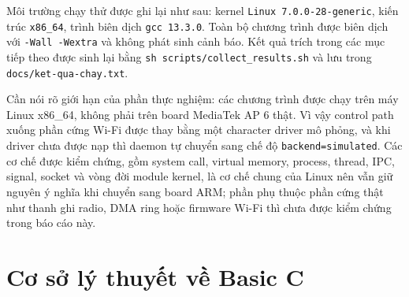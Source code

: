 \documentclass[11pt]{article}
\newcommand{\code}[1]{\texttt{#1}}
\begin{document}
\begin{center}
\end{center}

Môi trường chạy thử được ghi lại như sau: kernel \code{Linux 7.0.0-28-generic}, kiến trúc \code{x86\_64}, trình biên dịch \code{gcc 13.3.0}. Toàn bộ chương trình được biên dịch với \code{-Wall -Wextra} và không phát sinh cảnh báo. Kết quả trích trong các mục tiếp theo được sinh lại bằng \code{sh scripts/collect\_results.sh} và lưu trong \code{docs/ket-qua-chay.txt}.

Cần nói rõ giới hạn của phần thực nghiệm: các chương trình được chạy trên máy Linux x86\_64, không phải trên board MediaTek AP 6 thật. Vì vậy control path xuống phần cứng Wi-Fi được thay bằng một character driver mô phỏng, và khi driver chưa được nạp thì daemon tự chuyển sang chế độ \code{backend=simulated}. Các cơ chế được kiểm chứng, gồm system call, virtual memory, process, thread, IPC, signal, socket và vòng đời module kernel, là cơ chế chung của Linux nên vẫn giữ nguyên ý nghĩa khi chuyển sang board ARM; phần phụ thuộc phần cứng thật như thanh ghi radio, DMA ring hoặc firmware Wi-Fi thì chưa được kiểm chứng trong báo cáo này.

\section{Cơ sở lý thuyết về Basic C}
\end{document}

